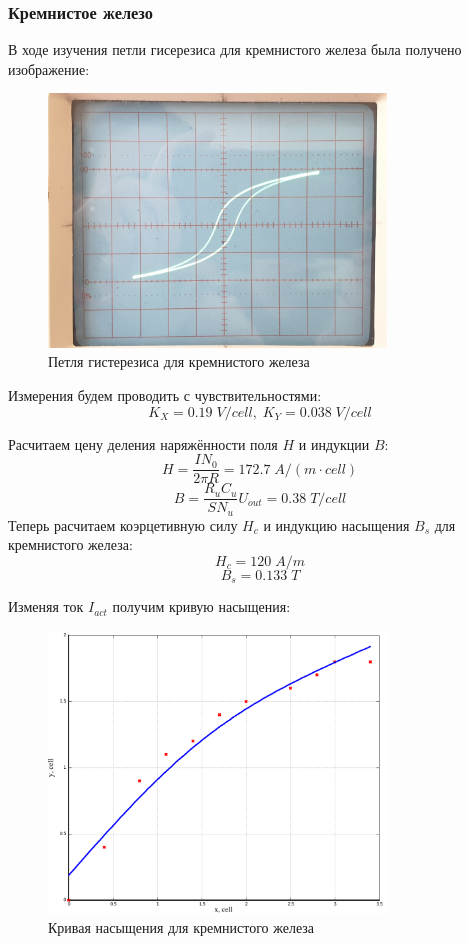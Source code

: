 \documentclass{article}
\begin{document}
\subsubsection{Кремнистое железо}
В ходе изучения петли гисерезиса для кремнистого железа была получено изображение:
\begin{figure}[H]
    \centering
    \includegraphics[width = 0.8\textwidth]{1-1.jpg}
    \caption{Петля гистерезиса для кремнистого железа}
\end{figure}

Измерения будем проводить с чувствительностями:
\[ K_X = 0.19\; V/cell,\; K_Y = 0.038\; V/cell  \]

Расчитаем цену деления наряжённости поля $H$ и индукции $B$:
\[ H = \frac{IN_0}{2\pi R} = 172.7\; A/(m\cdot cell) \]
\[ B = \frac{R_uC_u}{SN_u}U_{out} = 0.38\; T/cell \]
Теперь расчитаем коэрцетивную силу $H_c$ и индукцию насыщения $B_s$ для кремнистого железа:
\[ H_c = 120\; A/m \]
\[ B_s = 0.133\; T \]

Изменяя ток $I_{act}$ получим кривую насыщения:
\begin{figure}[H]
    \centering
    \includegraphics[width = 0.8\textwidth]{1-d.png}
    \caption{Кривая насыщения для кремнистого железа}
\end{figure}
\end{document}
